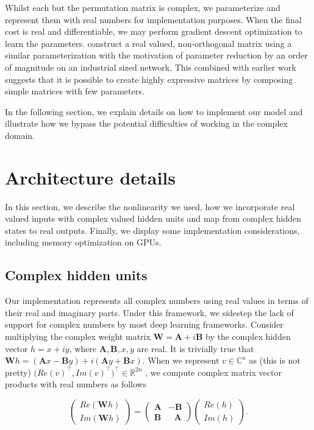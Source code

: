 \documentclass{article} %
\newcommand{\matr}[1]{\mathbf{#1}}
\newcommand\RR{\mathbb{R}}
\newcommand\CC{\mathbb{C}}
\begin{document}
Whilst each but the permutation matrix is complex, we parameterize and represent them with real numbers
for implementation purposes. When the final cost is real and differentiable, we may perform gradient descent 
optimization to learn the parameters.
\cite{dfc} construct a real valued, non-orthogonal matrix using a similar parameterization with the motivation
of parameter reduction by an order of magnitude on an industrial sized network. This combined with earlier
work \cite{fastfood} suggests that it is possible to create highly expressive matrices by composing simple
matrices with few parameters.

In the following section, we explain details on how to implement our model and illustrate how we bypass the
potential difficulties of working in the complex domain.

\section{Architecture details}

In this section, we describe the nonlinearity we used, how we incorporate real valued inputs 
with complex valued hidden units and map from complex hidden states to real outputs. 
{\color{red}Finally, we display some implementation considerations, including memory optimization on GPUs}.

\subsection{Complex hidden units}

Our implementation represents all complex numbers using real values in terms of their
real and imaginary parts. Under this framework, we sidestep the lack of support for complex numbers 
by most deep learning frameworks. Consider multiplying the complex weight matrix 
$\matr{W} = \matr{A} + i \matr{B}$ by the complex hidden vector $h = x + i y$, where
$\matr{A}, \matr{B}, x, y$ are real.
It is trivially true that $\matr{W}h = (\matr{A}x - \matr{B}y) + i (\matr{A}y + \matr{B}x)$.
When we represent $v \in \CC^n$ as {\color{red} (this is not pretty)} $\big(Re(v)^\top, Im(v)^\top \big)^\top \in \RR^{2n}$ , we
compute complex matrix vector products with real numbers as follows

\begin{equation} \begin{pmatrix} Re(\matr{W}h) \\ Im(\matr{W}h) \end{pmatrix}  
= \begin{pmatrix} \matr{A} & -\matr{B} \\ \matr{B} & \ \ \ 
\matr{A} \end{pmatrix} \begin{pmatrix} Re(h) \\ Im(h) \end{pmatrix} .
\end{equation}
\end{document}
